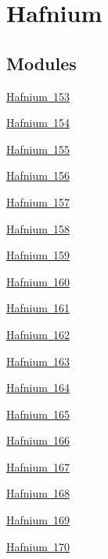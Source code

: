 \hypertarget{group___isotope_const-_hafnium}{}\section{Hafnium}
\label{group___isotope_const-_hafnium}
\subsection*{Modules}
\begin{DoxyCompactItemize}
\item 
\mbox{\hyperlink{group___isotope_const-_hafnium-_hf153}{Hafnium 153}}
\item 
\mbox{\hyperlink{group___isotope_const-_hafnium-_hf154}{Hafnium 154}}
\item 
\mbox{\hyperlink{group___isotope_const-_hafnium-_hf155}{Hafnium 155}}
\item 
\mbox{\hyperlink{group___isotope_const-_hafnium-_hf156}{Hafnium 156}}
\item 
\mbox{\hyperlink{group___isotope_const-_hafnium-_hf157}{Hafnium 157}}
\item 
\mbox{\hyperlink{group___isotope_const-_hafnium-_hf158}{Hafnium 158}}
\item 
\mbox{\hyperlink{group___isotope_const-_hafnium-_hf159}{Hafnium 159}}
\item 
\mbox{\hyperlink{group___isotope_const-_hafnium-_hf160}{Hafnium 160}}
\item 
\mbox{\hyperlink{group___isotope_const-_hafnium-_hf161}{Hafnium 161}}
\item 
\mbox{\hyperlink{group___isotope_const-_hafnium-_hf162}{Hafnium 162}}
\item 
\mbox{\hyperlink{group___isotope_const-_hafnium-_hf163}{Hafnium 163}}
\item 
\mbox{\hyperlink{group___isotope_const-_hafnium-_hf164}{Hafnium 164}}
\item 
\mbox{\hyperlink{group___isotope_const-_hafnium-_hf165}{Hafnium 165}}
\item 
\mbox{\hyperlink{group___isotope_const-_hafnium-_hf166}{Hafnium 166}}
\item 
\mbox{\hyperlink{group___isotope_const-_hafnium-_hf167}{Hafnium 167}}
\item 
\mbox{\hyperlink{group___isotope_const-_hafnium-_hf168}{Hafnium 168}}
\item 
\mbox{\hyperlink{group___isotope_const-_hafnium-_hf169}{Hafnium 169}}
\item 
\mbox{\hyperlink{group___isotope_const-_hafnium-_hf170}{Hafnium 170}}

\end{DoxyCompactItemize}
